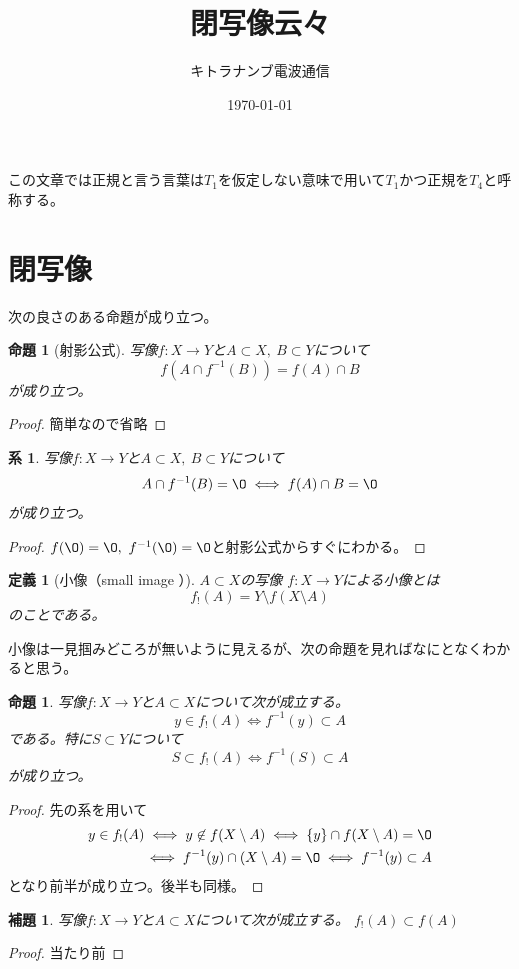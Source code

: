 \documentclass[leqno]{jsarticle}
\title{閉写像云々}
\author{キトラナンブ電波通信}
\date{\today}
\newtheorem{prop}[thm]{命題}
\newtheorem{cor}[thm]{系}
\newtheorem{lem}[thm]{補題}
\newtheorem{df}[thm]{定義}
\begin{document}
\maketitle
この文章では正規と言う言葉は$T_1$を仮定しない意味で用いて$T_1$かつ正規を$T_4$と呼称する。

\section{閉写像}
次の良さのある命題が成り立つ。
\begin{prop}[射影公式]\label{yoi}
写像$f:X\to Y$と$A\subset X,\ B\subset Y$について
\[
f(A\cap f^{-1}(B))=f(A)\cap B
\]
が成り立つ。
\end{prop}
\begin{proof}
簡単なので省略
\end{proof}
\begin{cor}\label{yosa}
写像$f:X\to Y$と$A\subset X,\ B\subset Y$について
\[
A\cap f^{-1}(B)=\O\iff f(A)\cap B=\O
\]
が成り立つ。
\end{cor}
\begin{proof}
$f(\O)=\O,\ f^{-1}(\O)=\O$と射影公式からすぐにわかる。
\end{proof}
\begin{df}[小像（small image ）]$A\subset X$の写像
$f:X\to Y$による小像とは
\[
f_!(A)=Y\setminus f(X\setminus A)
\]
のことである。
\end{df}
小像は一見掴みどころが無いように見えるが、次の命題を見ればなにとなくわかると思う。
\begin{prop}\label{wakari}
写像$f:X\to Y$と$A\subset X$について次が成立する。
\[
y\in f_!(A)\iff f^{-1}(y)\subset A
\]
である。特に$S\subset Y$について
\[
S\subset f_!(A)\iff f^{-1}(S)\subset A
\]
が成り立つ。
\end{prop}
\begin{proof}
先の系を用いて
\begin{eqnarray*}
y\in f_!(A)\iff y\not\in f(X\setminus A)\iff \{y\}\cap f(X\setminus A)=\O
\\ 
\iff f^{-1}(y)\cap (X\setminus A)=\O\iff f^{-1}(y)\subset A
\end{eqnarray*}
となり前半が成り立つ。後半も同様。
\end{proof}
\begin{lem}
写像$f:X\to Y$と$A\subset X$について次が成立する。
$f_!(A)\subset f(A)$
\end{lem}
\begin{proof}
当たり前
\end{proof}
\end{document}
